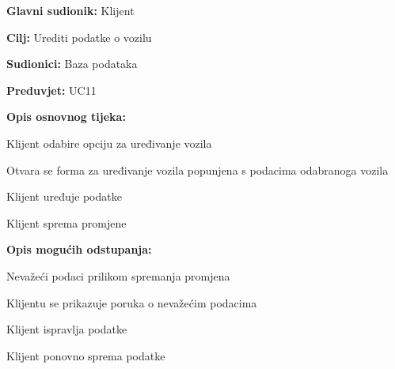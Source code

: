 \noindent {}
\begin{packed_item}
	
	\item \textbf{Glavni sudionik:} Klijent
	\item \textbf{Cilj:} Urediti podatke o vozilu
	\item \textbf{Sudionici:} Baza podataka
	\item \textbf{Preduvjet:} UC11
	\item \textbf{Opis osnovnog tijeka:}
	
	\item[] \begin{packed_enum}
		
		\item Klijent odabire opciju za uređivanje vozila
		\item Otvara se forma za uređivanje vozila popunjena s podacima odabranoga vozila
		\item Klijent uređuje podatke
		\item Klijent sprema promjene
	
	\end{packed_enum}
	
	\item  \textbf{Opis mogućih odstupanja:}
	
	\item[] \begin{packed_item}
		
		\item[3.a] Nevažeći podaci prilikom spremanja promjena
		\item[] \begin{packed_enum}
			
			\item Klijentu se prikazuje poruka o nevažećim podacima
			\item Klijent ispravlja podatke
			\item Klijent ponovno sprema podatke
			
		\end{packed_enum}
		
	\end{packed_item}

\end{packed_item}

